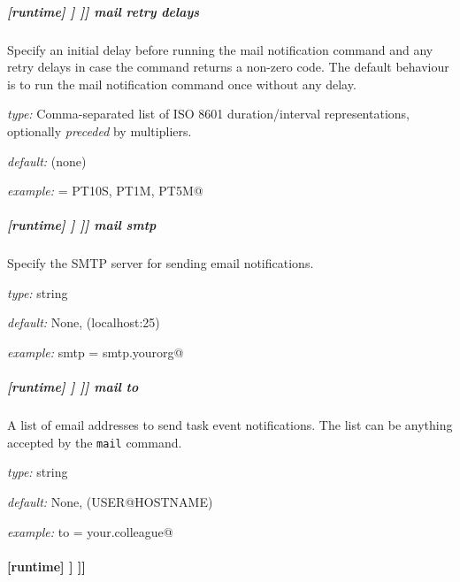 \subparagraph[mail retry delays]{[runtime] \textrightarrow [[\_\_NAME\_\_]] \textrightarrow [[[events]]] \textrightarrow mail retry delays}

Specify an initial delay before running the mail notification command and any
retry delays in case the command returns a non-zero code. The default behaviour
is to run the mail notification command once without any delay.

\begin{myitemize}
    \item {\em type:} Comma-separated list of ISO 8601 duration/interval representations, optionally {\em preceded} by multipliers.
    \item {\em default:} (none)
    \item {\em example:} \lstinline@handler = PT10S, PT1M, PT5M@
\end{myitemize}

\subparagraph[mail smtp]{[runtime] \textrightarrow [[\_\_NAME\_\_]] \textrightarrow [[[events]]] \textrightarrow mail smtp}

Specify the SMTP server for sending email notifications.

\begin{myitemize}
    \item {\em type:} string
    \item {\em default:} None, (localhost:25)
    \item {\em example:} \lstinline@mail smtp = smtp.yourorg@
\end{myitemize}

\subparagraph[mail to]{[runtime] \textrightarrow [[\_\_NAME\_\_]] \textrightarrow [[[events]]] \textrightarrow mail to}

A list of email addresses to send task event notifications. The list can be
anything accepted by the \lstinline=mail= command.

\begin{myitemize}
    \item {\em type:} string
    \item {\em default:} None, (USER@HOSTNAME)
    \item {\em example:} \lstinline@mail to = your.colleague@
\end{myitemize}

\paragraph[{[[[}environment{]]]}]{[runtime] \textrightarrow [[\_\_NAME\_\_]] \textrightarrow [[[environment]]]}

